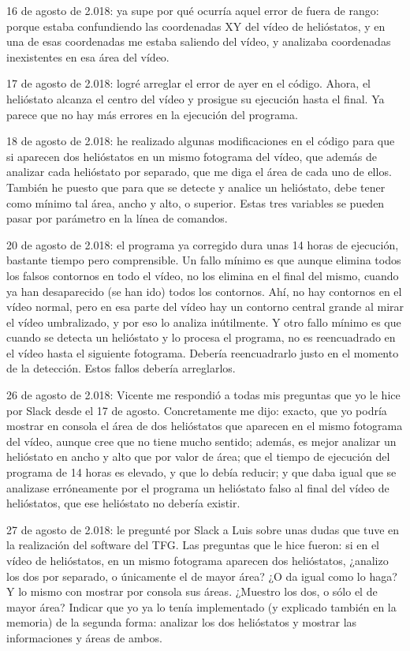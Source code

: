 \documentclass[12pt]{article}
\begin{document}
16 de agosto de 2.018: ya supe por qué ocurría aquel error de fuera de rango: porque estaba confundiendo las coordenadas XY del vídeo de helióstatos, y en una de esas coordenadas me estaba saliendo del vídeo, y analizaba coordenadas inexistentes en esa área del vídeo.

17 de agosto de 2.018: logré arreglar el error de ayer en el código. Ahora, el helióstato alcanza el centro del vídeo y prosigue su ejecución hasta el final. Ya parece que no hay más errores en la ejecución del programa.

18 de agosto de 2.018: he realizado algunas modificaciones en el código para que si aparecen dos helióstatos en un mismo fotograma del vídeo, que además de analizar cada helióstato por separado, que me diga el área de cada uno de ellos. También he puesto que para que se detecte y analice un helióstato, debe tener como mínimo tal área, ancho y alto, o superior. Estas tres variables se pueden pasar por parámetro en la línea de comandos.

20 de agosto de 2.018: el programa ya corregido dura unas 14 horas de ejecución, bastante tiempo pero comprensible. Un fallo mínimo es que aunque elimina todos los falsos contornos en todo el vídeo, no los elimina en el final del mismo, cuando ya han desaparecido (se han ido) todos los contornos. Ahí, no hay contornos en el vídeo normal, pero en esa parte del vídeo hay un contorno central grande al mirar el vídeo umbralizado, y por eso lo analiza inútilmente. Y otro fallo mínimo es que cuando se detecta un helióstato y lo procesa el programa, no es reencuadrado en el vídeo hasta el siguiente fotograma. Debería reencuadrarlo justo en el momento de la detección. Estos fallos debería arreglarlos.

26 de agosto de 2.018: Vicente me respondió a todas mis preguntas que yo le hice por Slack desde el 17 de agosto. Concretamente me dijo: exacto, que yo podría mostrar en consola el área de dos helióstatos que aparecen en el mismo fotograma del vídeo, aunque cree que no tiene mucho sentido; además, es mejor analizar un helióstato en ancho y alto que por valor de área; que el tiempo de ejecución del programa de 14 horas es elevado, y que lo debía reducir; y que daba igual que se analizase erróneamente por el programa un helióstato falso al final del vídeo de helióstatos, que ese helióstato no debería existir.

27 de agosto de 2.018: le pregunté por Slack a Luis sobre unas dudas que tuve en la realización del software del TFG. Las preguntas que le hice fueron: si en el vídeo de helióstatos, en un mismo fotograma aparecen dos helióstatos, ¿analizo los dos por separado, o únicamente el de mayor área? ¿O da igual como lo haga? Y lo mismo con mostrar por consola sus áreas. ¿Muestro los dos, o sólo el de mayor área? Indicar que yo ya lo tenía implementado (y explicado también en la memoria) de la segunda forma: analizar los dos helióstatos y mostrar las informaciones y áreas de ambos.
\end{document}
